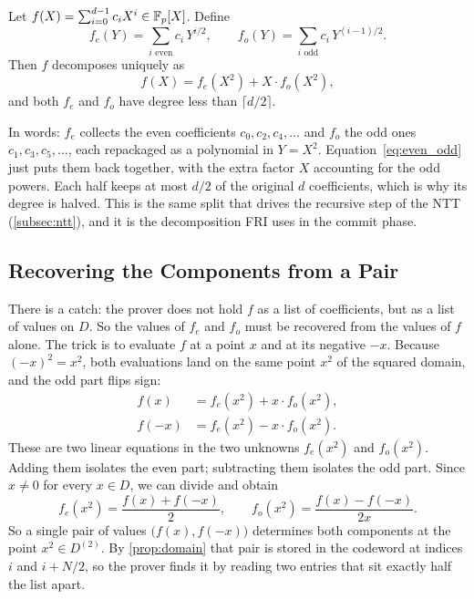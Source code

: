 \begin{definition}
\label{def:even_odd}
Let $f(X) = \sum_{i=0}^{d-1} c_i X^i \in \mathbb{F}_p[X]$. Define
%
\[
f_{e}(Y) = \sum_{i \text{ even}} c_i \, Y^{i/2},
\qquad
f_{o}(Y) = \sum_{i \text{ odd}} c_i \, Y^{(i-1)/2}.
\]
%
Then $f$ decomposes uniquely as
%
\begin{equation}
\label{eq:even_odd}
f(X) = f_{e}(X^2) + X \cdot f_{o}(X^2),
\end{equation}
%
and both $f_e$ and $f_o$ have degree less than $\lceil d/2 \rceil$.
\end{definition}

In words: $f_e$ collects the even coefficients $c_0, c_2, c_4, \ldots$
and $f_o$ the odd ones $c_1, c_3, c_5, \ldots$, each repackaged as a
polynomial in $Y = X^2$. Equation~\eqref{eq:even_odd} just puts them back
together, with the extra factor $X$ accounting for the odd powers. Each
half keeps at most $d/2$ of the original $d$ coefficients, which is why
its degree is halved. This is the same split that drives the recursive
step of the NTT (\cref{subsec:ntt}), and it is the decomposition FRI uses
in the commit phase.


\subsection{Recovering the Components from a Pair}
\label{subsec:recovering}

There is a catch: the prover does not hold $f$ as a list of coefficients,
but as a list of values on $D$. So the values of $f_e$ and $f_o$ must be
recovered from the values of $f$ alone. The trick is to evaluate $f$ at a
point $x$ and at its negative $-x$. Because $(-x)^2 = x^2$, both
evaluations land on the same point $x^2$ of the squared domain, and the
odd part flips sign:
%
\begin{equation}
\label{eq:fold_system}
\begin{aligned}
f(x)  &= f_{e}(x^2) + x \cdot f_{o}(x^2), \\
f(-x) &= f_{e}(x^2) - x \cdot f_{o}(x^2).
\end{aligned}
\end{equation}
%
These are two linear equations in the two unknowns $f_{e}(x^2)$ and
$f_{o}(x^2)$. Adding them isolates the even part; subtracting them
isolates the odd part. Since $x \neq 0$ for every $x \in D$, we can
divide and obtain
%
\begin{equation}
\label{eq:fold_solve}
f_{e}(x^2) = \frac{f(x) + f(-x)}{2},
\qquad
f_{o}(x^2) = \frac{f(x) - f(-x)}{2x}.
\end{equation}
%
So a single pair of values $\bigl(f(x), f(-x)\bigr)$ determines both
components at the point $x^2 \in D^{(2)}$. By \cref{prop:domain} that pair
is stored in the codeword at indices $i$ and $i + N/2$, so the prover
finds it by reading two entries that sit exactly half the list apart.


